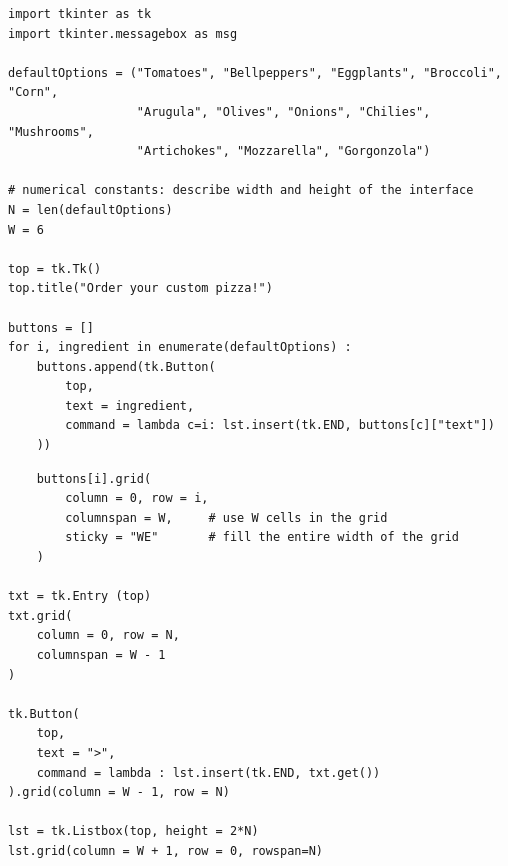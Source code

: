 \begin{frame}[fragile]
%
\begin{codebox}
\begin{verbatim}
import tkinter as tk
import tkinter.messagebox as msg

defaultOptions = ("Tomatoes", "Bellpeppers", "Eggplants", "Broccoli", "Corn",
                  "Arugula", "Olives", "Onions", "Chilies", "Mushrooms",
                  "Artichokes", "Mozzarella", "Gorgonzola")

# numerical constants: describe width and height of the interface
N = len(defaultOptions)
W = 6

top = tk.Tk()
top.title("Order your custom pizza!")

buttons = []
for i, ingredient in enumerate(defaultOptions) :
    buttons.append(tk.Button(
        top,
        text = ingredient,
        command = lambda c=i: lst.insert(tk.END, buttons[c]["text"])
    ))
\end{verbatim}
\end{codebox}
%
\end{frame}


\begin{frame}[fragile]
%
\begin{codebox}
\begin{verbatim}
    buttons[i].grid(
        column = 0, row = i,
        columnspan = W,     # use W cells in the grid
        sticky = "WE"       # fill the entire width of the grid
    )

txt = tk.Entry (top)
txt.grid(
    column = 0, row = N,
    columnspan = W - 1
)

tk.Button(
    top,
    text = ">",
    command = lambda : lst.insert(tk.END, txt.get())
).grid(column = W - 1, row = N)

lst = tk.Listbox(top, height = 2*N)
lst.grid(column = W + 1, row = 0, rowspan=N)
\end{verbatim}
\end{codebox}
%
\end{frame}


